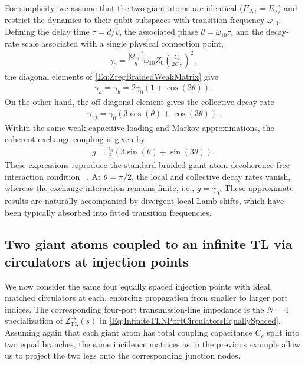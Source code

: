 \documentclass[prx,aps,twocolumn,article]{revtex4-2}
\newcommand{\msf}[1]{\mathsf{#1}}
\newcommand{\msZ}{\msf{Z}}
\newcommand{\msZTL}{\msZ_{\mathrm{TL}}}
\begin{document}
For simplicity, we assume that the two giant atoms are identical ($E_{J,i}=E_J$) and restrict the dynamics to their qubit subspaces with transition frequency $\omega_{10}$. Defining the delay time $\tau=d/v$, the associated phase $\theta=\omega_{10}\tau$, and the decay-rate scale associated with a single physical connection point,
\begin{align}
    \gamma_0
    =
    \frac{|Q_{10}|^2}{\hbar}
    \omega_{10} Z_0
    \left(
        \frac{C_c}{2C_\Sigma}
    \right)^2,
    \label{Eq:SinglePointRateBraided}
\end{align}
the diagonal elements of \cref{Eq:ZregBraidedWeakMatrix} give
\begin{align}
    \gamma_a=\gamma_b
    =
    2\gamma_0
    \left(
        1+\cos(2\theta)
    \right).
    \label{Eq:BraidedLocalDecay}
\end{align}
On the other hand, the off-diagonal element gives the collective decay rate
\begin{align}
    \gamma_{12}
    =
    \gamma_0
    \left(
        3\cos(\theta)+\cos(3\theta)
    \right).
    \label{Eq:BraidedCollectiveDecay}
\end{align}
Within the same weak-capacitive-loading and Markov approximations, the coherent exchange coupling is given by
\begin{align}
    g
    =
    \frac{\gamma_0}{2}
    \left(
        3\sin(\theta)+\sin(3\theta)
    \right).
    \label{Eq:BraidedExchange}
\end{align}
These expressions reproduce the standard braided-giant-atom decoherence-free interaction condition
~\cite{Kockum:2018,Soro:2022}. At $\theta=\pi/2$, the local and collective decay rates vanish, whereas the exchange interaction remains finite, i.e., $g=\gamma_0$. These approximate results are naturally accompanied by divergent local Lamb shifts, which have been typically absorbed into fitted transition frequencies.

\subsection{Two giant atoms coupled to an infinite TL via circulators at injection points}
\label{App:BraidedGACirculators}
We now consider the same four equally spaced injection points with ideal, matched circulators at each, enforcing propagation from smaller to larger port indices. The corresponding four-port
transmission-line impedance is the $N=4$ specialization of $\msZTL^{\rightarrow}(s)$ in \cref{Eq:InfiniteTLNPortCirculatorsEquallySpaced}. Assuming again that each giant atom has total coupling capacitance $C_c$ split into two equal branches, the same incidence matrices as in the previous example allow us to project the two legs onto the corresponding junction nodes.
\end{document}
